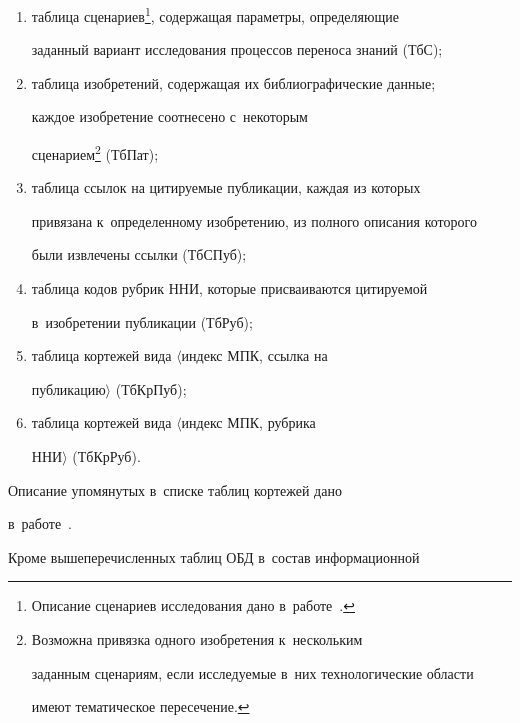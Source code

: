      \begin{enumerate}[(1)]


\item таблица сценариев\footnote{Описание сценариев исследования дано в~работе~\cite{19-mm}.}, содержащая параметры, определяющие 


заданный вариант исследования процессов переноса знаний (ТбС);


\item таблица изобретений, содержащая их библиографические данные; 


каждое изобретение соотнесено с~некоторым 


сценарием\footnote{Возможна привязка одного изобретения к~нескольким 


заданным сценариям, если исследуемые в~них технологические области 


имеют тематическое пересечение.} (ТбПат);


\item таблица ссылок на цитируемые публикации, каждая из которых 


привязана к~определенному изобретению, из полного описания которого 


были извлечены ссылки (ТбСПуб);


\item таблица кодов рубрик ННИ, которые присваиваются цитируемой 


в~изобретении публикации (ТбРуб);








\item таблица кортежей вида $\langle$индекс МПК, ссылка на 


публикацию$\rangle$ (ТбКрПуб);


\item таблица кортежей вида $\langle$индекс МПК, рубрика 


ННИ$\rangle$ (ТбКрРуб).


\end{enumerate}





     Описание упомянутых в~списке таблиц кортежей дано  


в~работе~\cite{19-mm}. 


     


     Кроме вышеперечисленных таблиц ОБД в~состав информационной 


